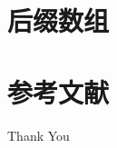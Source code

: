 \documentclass{beamer}
\begin{document}
\section{后缀数组}

\section{参考文献}

\begin{frame}[allowframebreaks]
    
    
    \nocite{*} %
\end{frame}


\begin{frame}
    \begin{center}
        {\Huge\calligra Thank You}
    \end{center}
\end{frame}
\end{document}
